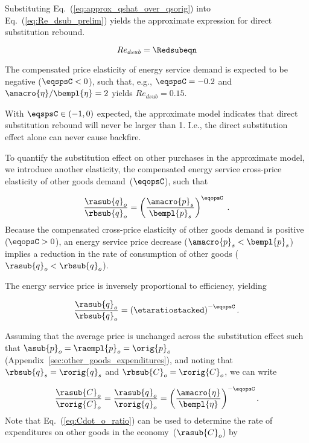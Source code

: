 Substituting Eq.~(\ref{eq:approx_qshat_over_qsorig}) into Eq.~(\ref{eq:Re_dsub_prelim})
yields the approximate expression for direct substitution rebound.

\begin{equation} \label{eq:Re_dsub_approx}
  Re_{dsub} = \Redsubeqn
\end{equation}

The compensated price elasticity of energy service demand is
expected to be negative ($\eqspsC < 0$), 
such that, e.g.,  
$\eqspsC = -0.2$ and $\amacro{\eta}/\bempl{\eta} = 2$
yields $Re_{dsub} = 0.15$.

With $\eqspsC \in (-1, 0)$ expected,
the approximate model indicates that
direct substitution rebound will never be larger than 1.
I.e., the direct substitution effect alone
can never cause backfire. 

To quantify the substitution effect on other purchases in the approximate model,
we introduce another elasticity,
the compensated energy service cross-price elasticity of other goods demand~($\eqopsC$), 
such that

\begin{equation}
  \frac{\rasub{q}_o}{\rbsub{q}_o} = \left( \frac{\amacro{p}_s}{\bempl{p}_s} \right) ^ {\eqopsC} \; .
\end{equation}
%
Because the compensated cross-price elasticity of other goods demand
is positive ($\eqopsC > 0$),
an energy service price decrease ($\amacro{p}_s < \bempl{p}_s$)
implies a reduction in the rate of consumption of other goods ($\rasub{q}_o < \rbsub{q}_o$).

The energy service price is inversely proportional to 
efficiency, yielding

\begin{equation} \label{eq:qohat_qostar}
  \frac{\rasub{q}_o}{\rbsub{q}_o} = \left( \etaratiostacked \right) ^ {-\eqopsC} .
\end{equation}

Assuming that the average price is unchanged across the substitution effect
such that $\asub{p}_o = \raempl{p}_o = \orig{p}_o$
(Appendix~\ref{sec:other_goods_expenditures}),
and noting that $\rbsub{q}_s = \rorig{q}_s$ and $\rbsub{C}_o = \rorig{C}_o$,
we can write

\begin{equation} \label{eq:Cdot_o_ratio}
  \frac{\rasub{C}_o}{\rorig{C}_o}
      = \frac{\rasub{q}_o}{\rorig{q}_o}
      = \left( \frac{\amacro{\eta}}{\bempl{\eta}} \right)^{-\eqopsC} .
\end{equation}
%
Note that Eq.~(\ref{eq:Cdot_o_ratio})
can be used to determine the rate of expenditures
on other goods in the economy~($\rasub{C}_o$) by

